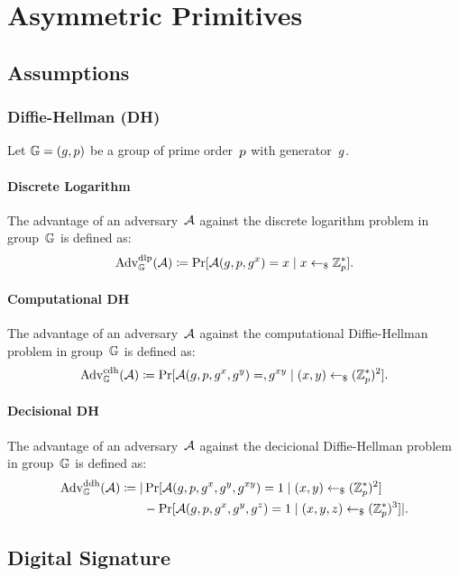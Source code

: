 \documentclass[a4paper,orivec]{llncs}
\begin{document}
\section{Asymmetric Primitives}


\subsection{Assumptions}

\subsubsection{Diffie-Hellman (DH)}
Let $\mathbb{G}=(g,p)$ be a group of prime order~$p$ with generator~$g$.

\paragraph{Discrete Logarithm}
The advantage of an adversary~$\mathcal{A}$ against the discrete logarithm problem in group~$\mathbb{G}$ is defined as:
\[
\mathrm{Adv}_{\mathbb{G}}^{\mathrm{dlp}}(\mathcal{A})\coloneqq\Pr[\mathcal{A}(g,p,g^x)=x\mid x\gets_\$\mathbb{Z}_p^*]\text{.}
\]


\paragraph{Computational DH}
The advantage of an adversary~$\mathcal{A}$ against the computational Diffie-Hellman problem in group~$\mathbb{G}$ is defined as:
\[
\mathrm{Adv}_{\mathbb{G}}^{\mathrm{cdh}}(\mathcal{A})\coloneqq\Pr[\mathcal{A}(g,p,g^x,g^y)=,g^{xy}\mid (x,y)\gets_\$(\mathbb{Z}_p^*)^2]\text{.}
\]

\paragraph{Decisional DH}
The advantage of an adversary~$\mathcal{A}$ against the decicional Diffie-Hellman problem in group~$\mathbb{G}$ is defined as:
\begin{align*}
    \mathrm{Adv}_{\mathbb{G}}^{\mathrm{ddh}}(\mathcal{A})\coloneqq|&\Pr[\mathcal{A}(g,p,g^x,g^y,g^{xy})=1\mid (x,y)\gets_\$(\mathbb{Z}_p^*)^2]\\
    &-\Pr[\mathcal{A}(g,p,g^x,g^y,g^z)=1\mid (x,y,z)\gets_\$(\mathbb{Z}_p^*)^3]|\text{.}
\end{align*}

\subsection{Digital Signature}
\end{document}
